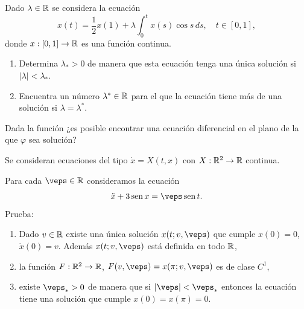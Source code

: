 \documentclass[12pt]{article}
\begin{document}
    \begin{ejercicio}
        Dado $\lambda \in \mathbb{R}$ se considera la ecuación
        \[
        x(t) = \frac{1}{2} x(1) + \lambda \int_0^t x(s) \cos s \, ds, \quad t \in [0, 1],
        \]
        donde $x : [0, 1] \to \mathbb{R}$ es una función continua.
        \begin{enumerate}[label=\alph*)]
            \item Determina $\lambda_* > 0$ de manera que esta ecuación tenga una única solución si $|\lambda| < \lambda_*$.
            \item Encuentra un número $\lambda^* \in \mathbb{R}$ para el que la ecuación tiene más de una solución si $\lambda = \lambda^*$.
        \end{enumerate}
    \end{ejercicio}

    \begin{ejercicio}
        Dada la función
        \Func{\varphi}{]0, \infty[}{\bb{R}}{t}{\cos\left(\frac{1}{t}\right)}
        ¿es posible encontrar una ecuación diferencial en el plano de la que $\varphi$ sea solución?
        \begin{observacion}
        Se consideran ecuaciones del tipo $\dot{x} = X(t, x)$ con $X : \mathbb{R}^2 \to \mathbb{R}$ continua.
        \end{observacion}
    \end{ejercicio}

    \begin{ejercicio}
        Para cada $\veps \in \bb{R}$ consideramos la ecuación
        \[
        \ddot{x} + 3 \operatorname{sen} x = \veps \operatorname{sen} t.
        \]
        Prueba:
        \begin{enumerate}[label=\alph*)]
            \item Dado $v \in \mathbb{R}$ existe una única solución $x(t; v, \veps)$ que cumple $x(0) = 0$, $\dot{x}(0) = v$. Además $x(t; v, \veps)$ está definida en todo $\mathbb{R}$,
            \item la función $F : \mathbb{R}^2 \to \mathbb{R}$, $F(v, \veps) = x(\pi; v, \veps)$ es de clase $C^1$,
            \item existe $\veps_* > 0$ de manera que si $|\veps| < \veps_*$ entonces la ecuación tiene una solución que cumple $x(0) = x(\pi) = 0$.
        \end{enumerate}
    \end{ejercicio}

    \newpage
    \setcounter{ejercicio}{0} %
\end{document}
